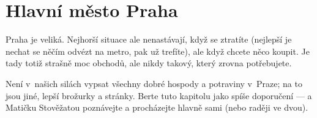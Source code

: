 \section{Hlavní město Praha}

Praha je veliká. Nejhorší situace ale nenastávají, když se ztratíte (nejlepší
je nechat se něčím odvézt na metro, pak už trefíte), ale když chcete něco
koupit. Je tady totiž strašně moc obchodů, ale nikdy takový, který zrovna
potřebujete.

Není v~našich silách vypsat všechny dobré hospody a potraviny v~Praze; na to jsou jiné, lepší brožurky a stránky. Berte tuto kapitolu jako spíše doporučení --- a Matičku Stověžatou poznávejte a procházejte hlavně sami (nebo raději ve dvou).